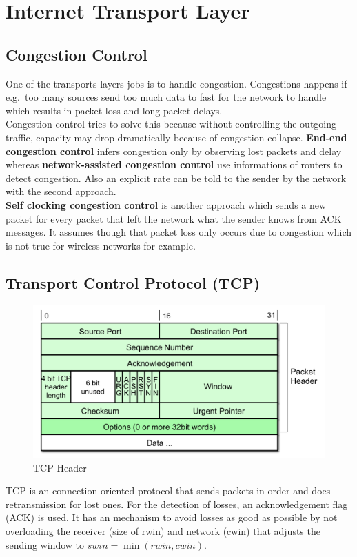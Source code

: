 
\section{Internet Transport Layer}
\subsection{Congestion Control}
One of the transports layers jobs is to handle congestion.
Congestions happens if e.g.\ too many sources send too much data to fast for the network to handle which results in packet loss and long packet delays.\\
Congestion control tries to solve this because without controlling the outgoing traffic, capacity may drop dramatically because of congestion collapse.
\textbf{End-end congestion control} infers congestion only by observing lost packets and delay whereas \textbf{network-assisted congestion control} use informations of routers to detect congestion.
Also an explicit rate can be told to the sender by the network with the second approach.\\

\textbf{Self clocking congestion control} is another approach which sends a new packet for every packet that left the network what the sender knows from ACK messages.
It assumes though that packet loss only occurs due to congestion which is not true for wireless networks for example.

\subsection{Transport Control Protocol (TCP)}
\begin{figure}[h]
  \centering
  \includegraphics[width=.7\textwidth]{figures/tcp_header.png}
  \caption{TCP Header}\label{fig:tcp_header}
\end{figure}
TCP is an connection oriented protocol that sends packets in order and does retransmission for lost ones.
For the detection of losses, an acknowledgement flag (ACK) is used.
It has an mechanism to avoid losses as good as possible by not overloading the receiver (size of rwin) and network (cwin) that adjusts the sending window to $swin = \min(rwin,cwin)$.\\

